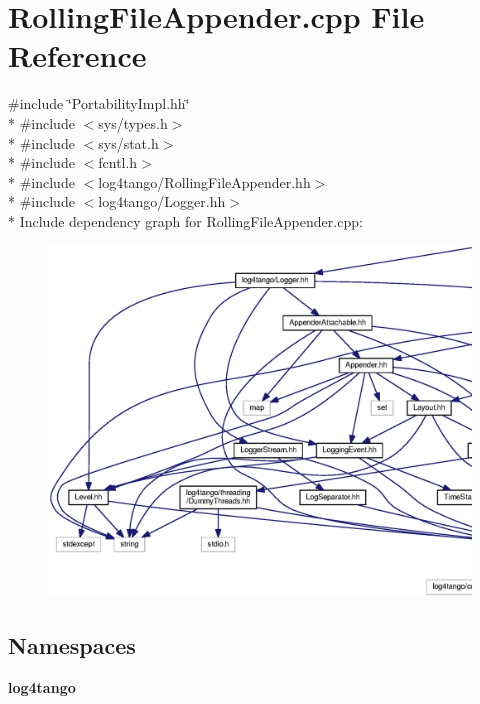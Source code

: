 \section{Rolling\-File\-Appender.\-cpp File Reference}
\label{RollingFileAppender_8cpp}
{\ttfamily \#include \char`\"{}Portability\-Impl.\-hh\char`\"{}}\\*
{\ttfamily \#include $<$sys/types.\-h$>$}\\*
{\ttfamily \#include $<$sys/stat.\-h$>$}\\*
{\ttfamily \#include $<$fcntl.\-h$>$}\\*
{\ttfamily \#include $<$log4tango/\-Rolling\-File\-Appender.\-hh$>$}\\*
{\ttfamily \#include $<$log4tango/\-Logger.\-hh$>$}\\*
Include dependency graph for Rolling\-File\-Appender.\-cpp\-:
\nopagebreak
\begin{figure}[H]
\begin{center}
\leavevmode
\includegraphics[width=350pt]{d3/d6d/RollingFileAppender_8cpp__incl}
\end{center}
\end{figure}
\subsection*{Namespaces}
\begin{DoxyCompactItemize}
\item 
{\bf log4tango}
\end{DoxyCompactItemize}
